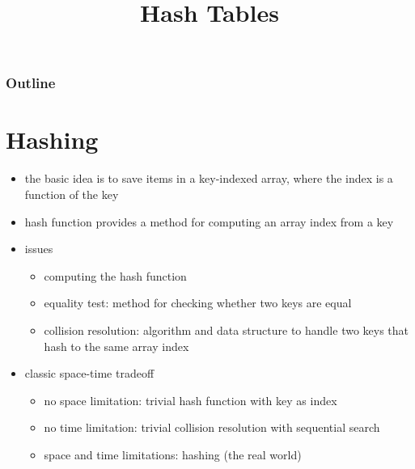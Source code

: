\documentclass[8pt,a4paper,compress]{beamer}
\title{Hash Tables}
\date{}
\begin{document}
\begin{frame}
\vfill
\titlepage
\end{frame}

\begin{frame}
\frametitle{Outline}
\tableofcontents
\end{frame}

\section{Hashing}
\begin{frame}[fragile]
\begin{itemize}
\item the basic idea is to save items in a key-indexed array, where the index is a function of the key

\item hash function provides a method for computing an array index from a key

\item issues
\begin{itemize}
\item computing the hash function

\item equality test: method for checking whether two keys are equal

\item collision resolution: algorithm and data structure to handle two keys that hash to the same array index
\end{itemize}

\item classic space-time tradeoff
\begin{itemize}
\item no space limitation: trivial hash function with key as index

\item no time limitation: trivial collision resolution with sequential search

\item space and time limitations: hashing (the real world)
\end{itemize}
\end{itemize}
\end{frame}
\end{document}
